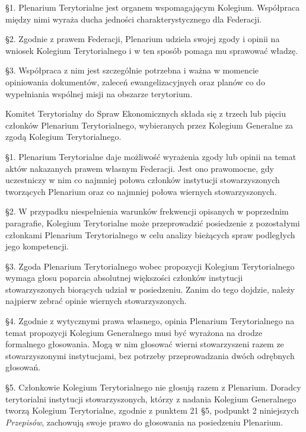 
 \S{}1. Plenarium Terytorialne jest organem wspomagającym Kolegium. Współpraca między nimi wyraża ducha jedności charakterystycznego dla Federacji.

\S{}2. Zgodnie z prawem Federacji, Plenarium udziela swojej zgody i opinii na wniosek Kolegium Terytorialnego i w ten sposób pomaga mu sprawować władzę.

\S{}3. Współpraca z nim jest szczególnie potrzebna i ważna w momencie opiniowania dokumentów, zaleceń ewangelizacyjnych oraz planów co do wypełniania wspólnej misji na obszarze terytorium.


 Komitet Terytorialny do Spraw Ekonomicznych składa się z trzech lub pięciu członków Plenarium Terytorialnego, wybieranych przez Kolegium Generalne za zgodą Kolegium Terytorialnego.


 \S{}1. Plenarium Terytorialne daje możliwość wyrażenia zgody lub opinii na temat aktów nakazanych prawem własnym Federacji. Jest ono prawomocne, gdy uczestniczy w nim co najmniej połowa członków instytucji stowarzyszonych tworzących Plenarium oraz co najmniej połowa wiernych stowarzyszonych.

\S{}2. W przypadku niespełnienia warunków frekwencji opisanych w poprzednim paragrafie, Kolegium Terytorialne może przeprowadzić posiedzenie z pozostałymi członkami Plenarium Terytorialnego w celu analizy bieżących spraw podległych jego kompetencji.

\S{}3. Zgoda Plenarium Terytorialnego wobec propozycji Kolegium Terytorialnego wymaga głosu poparcia absolutnej większości członków instytucji stowarzyszonych biorących udział w posiedzeniu. Zanim do tego dojdzie, należy najpierw zebrać opinie wiernych stowarzyszonych.

\S{}4. Zgodnie z wytycznymi prawa własnego, opinia Plenarium Terytorialnego na temat propozycji Kolegium Generalnego musi być wyrażona na drodze formalnego głosowania. Mogą w nim głosować wierni stowarzyszeni razem ze stowarzyszonymi instytucjami, bez potrzeby przeprowadzania dwóch odrębnych głosowań. 

\S{}5. Członkowie Kolegium Terytorialnego nie głosują razem z Plenarium. Doradcy terytorialni instytucji stowarzyszonych, którzy z nadania Kolegium Generalnego tworzą Kolegium Terytorialne, zgodnie z punktem 21 \S{}5, podpunkt 2 niniejszych {\em Przepisów}, zachowują swoje prawo do głosowania na posiedzeniu Plenarium.


